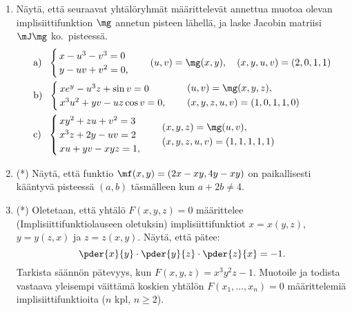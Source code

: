\begin{enumerate}
\item
Näytä, että seuraavat yhtälöryhmät määrittelevät annettua muotoa olevan implisiittifunktion
$\mg$ annetun pisteen lähellä, ja laske Jacobin matriisi $\mJ\mg$ ko.\ pisteessä.
\begin{align*}
&\text{a)}\ \ \begin{cases} \,x-u^3-v^3=0 \\ \,y-uv+v^2=0, \end{cases} \quad
              (u,v)=\mg(x,y), \quad (x,y,u,v)=(2,0,1,1) \\
&\text{b)}\ \ \begin{cases} \,xe^y-u^3z+\sin v=0 \\ \,x^3u^2+yv-uz\cos v=0, \end{cases} \quad 
              \begin{aligned} &(u,v)=\mg(x,y,z), \\ &(x,y,z,u,v)=(1,0,1,1,0) \end{aligned} \\
&\text{c)}\ \ \begin{cases} 
              \,xy^2+zu+v^2=3 \\ \,x^3z+2y-uv=2 \\ \,xu+yv-xyz=1,
              \end{cases} \quad 
              \begin{aligned} &(x,y,z)=\mg(u,v), \\ &(x,y,z,u,v)=(1,1,1,1,1) \end{aligned}
\end{align*}

\item (*)
Näytä, että funktio $\mf(x,y)=(2x-xy,4y-xy)$ on paikallisesti kääntyvä pisteessä $(a,b)$
täsmälleen kun $a+2b \neq 4$.

\item (*)
Oletetaan, että yhtälö $F(x,y,z)=0$ määrittelee (Implisiittifunktiolauseen oletuksin)
implisiittifunktiot $x=x(y,z)$, $y=y(z,x)$ ja $z=z(x,y)$. Näytä, että pätee:
\[
\pder{x}{y}\cdot\pder{y}{z}\cdot\pder{z}{x}=-1.
\]
Tarkista säännön pätevyys, kun $F(x,y,z)=x^3y^2z-1$. Muotoile ja todista vastaava yleisempi
väittämä koskien yhtälön $F(x_1,\ldots,x_n)=0$ määrittelemiä implisiittifunktioita 
($n$ kpl, $n \ge 2$).

\end{enumerate}